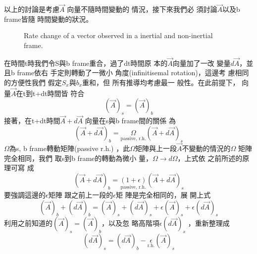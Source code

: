 \documentclass[12pt,a4paper]{article}
\begin{document}
\bigskip

以上的討論是考慮$\vec{A}$%
向量不隨時間變動的%
情況，接下來我們必%
須討論$\vec{A}$以及b frame皆隨%
時間變動的狀況。

\bigskip 
\begin{figure}[th]
\caption{Rate change of a vector observed in a inertial and non-inertial
frame.}
\label{ratevecfig}
\begin{center}
\end{center}
\end{figure}

\bigskip 在時間t時我們令S與b
frame重合，過了dt時間原%
本的$\vec{A}$向量加了一改%
變量$d\vec{A}$，並且b frame依右%
手定則轉動了一微小%
角度(infinitisemal rotation)，這邊考%
慮相同的方便性我們%
假定$S_{x}$與$b_{x}$重和，但%
所有推導均考慮最一%
般性。在此前提下，%
向量$\vec{A}$在t到t+dt時間皆%
符合%
\begin{equation*}
\left( \vec{A}\right) _{s}=\left( \vec{A}\right) _{b}
\end{equation*}%
接著，在t+dt時間$\vec{A}+d\vec{A}$%
向量在s與b frame間的關係%
為%
\begin{equation*}
\left( \vec{A}+d\vec{A}\right) _{b}=\underset{\text{passive, r.h.}}{\Omega }%
\left( \vec{A}+d\vec{A}\right) _{s}
\end{equation*}%
$\Omega $為s, b frame轉動矩陣(passive r.h.)%
，此$\Omega $矩陣與上一段$%
\vec{A}$不變動的情況的$\Omega $%
矩陣完全相同，我們%
取s到b frame的轉動為微小%
量，$\Omega \rightarrow d\Omega $，上式依%
之前所述的原理可寫%
成%
\begin{equation*}
\left( \vec{A}+d\vec{A}\right) _{b}=\underset{\text{passive, r.h.}}{\left(
1+\epsilon \right) }\left( \vec{A}+d\vec{A}\right) _{s}
\end{equation*}%
要強調這邊的$\epsilon $矩陣%
跟之前上一段的$\epsilon $矩%
陣是完全相同的，展%
開上式%
\begin{equation*}
\left( \vec{A}\right) _{b}+\left( d\vec{A}\right) _{b}=\left( \vec{A}\right)
_{s}+\left( d\vec{A}\right) _{s}+\epsilon \left( \vec{A}\right)
_{s}+\epsilon \left( d\vec{A}\right) _{s}
\end{equation*}%
利用之前知道的$\left( \vec{A}%
\right) _{s}=\left( \vec{A}\right) _{b}$，以及忽%
略高階項$\epsilon \left( d\vec{A}\right) _{s}$%
，重新整理成%
\begin{equation*}
\left( d\vec{A}\right) _{s}=\left( d\vec{A}\right) _{b}-\underset{\text{r.h.}%
}{\epsilon }\left( \vec{A}\right) _{s}
\end{equation*}%
\end{document}
